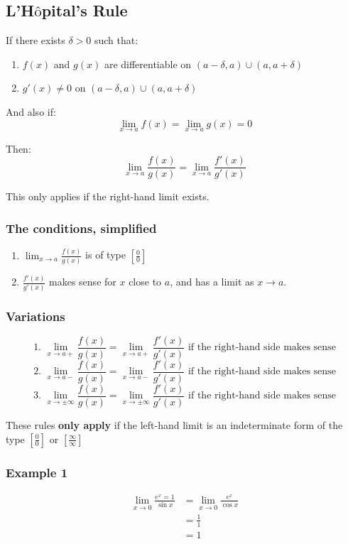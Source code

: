 \documentclass[11pt]{article}
\begin{document}
\newpage
\subsection{L'H\(\text{\^o}\)pital's Rule}
\label{sec:org5e65f86}
If there exists \(\delta > 0\) such that:
\begin{enumerate}
\item \(f(x)\) and \(g(x)\) are differentiable on \((a - \delta, a) \cup (a, a + \delta)\)
\item \(g'(x) \neq 0\) on \((a - \delta, a) \cup (a, a + \delta)\)
\end{enumerate}

And also if:
\[\lim_{x \rightarrow a} f(x) = \lim_{x \rightarrow a} g(x) = 0\]

Then:
\[\lim_{x \rightarrow a} \frac{f(x)}{g(x)} = \lim_{x \rightarrow a} \frac{f'(x)}{g'(x)}\]

This only applies if the right-hand limit exists.
\subsubsection{The conditions, simplified}
\label{sec:orgd36c085}
\begin{enumerate}
\item \(\lim_{x \rightarrow a} \frac{f(x)}{g(x)}\) is of type \(\left[ \frac{0}{0}\right]\)
\item \(\frac{f'(x)}{g'(x)}\) makes sense for \(x\) close to \(a\), and has a limit as \(x \rightarrow a\).
\end{enumerate}
\subsubsection{Variations}
\label{sec:org48f83ce}
\[\text{1. } \lim_{x \rightarrow a+} \frac{f(x)}{g(x)} = \lim_{x \rightarrow a+} \frac{f'(x)}{g'(x)} \text{ if the right-hand side makes sense}\]
\[\text{2. } \lim_{x \rightarrow a-} \frac{f(x)}{g(x)} = \lim_{x \rightarrow a-} \frac{f'(x)}{g'(x)} \text{ if the right-hand side makes sense}\]
\[\text{3. } \lim_{x \rightarrow \pm \infty} \frac{f(x)}{g(x)} = \lim_{x \rightarrow \pm \infty} \frac{f'(x)}{g'(x)} \text{ if the right-hand side makes sense}\]

These rules \textbf{only apply} if the left-hand limit is an indeterminate form of the type \(\left[\frac{0}{0} \right]\) or \(\left[ \frac{\infty}{\infty} \right]\)
\subsubsection{Example 1}
\label{sec:org6adfa74}
\begin{align*}
\lim_{x \rightarrow 0} \frac{e^x = 1}{\sin x} &= \lim_{x \rightarrow 0} \frac{e^x}{\cos x} \\
&= \frac{1}{1} \\
&= 1
\end{align*}
\end{document}
